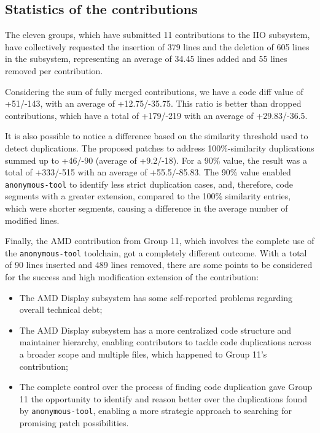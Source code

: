 \documentclass[10pt,conference]{IEEEtran}
\begin{document}
\subsection{Statistics of the contributions}

The eleven groups, which have submitted 11 contributions to the IIO subsystem, have collectively requested the insertion of 379 lines and the deletion of 605 lines in the subsystem, representing an average of 34.45 lines added and 55 lines removed per contribution.

Considering the sum of fully merged contributions, we have a code diff value of +51/-143, with an average of +12.75/-35.75. This ratio is better than dropped contributions, which have a total of +179/-219 with an average of +29.83/-36.5.

It is also possible to notice a difference based on the similarity threshold used to detect duplications. The proposed patches to address 100\%-similarity duplications summed up to +46/-90 (average of +9.2/-18). For a 90\% value, the result was a total of +333/-515 with an average of +55.5/-85.83. The 90\% value enabled \texttt{anonymous-tool} to identify less strict duplication cases, and, therefore, code segments with a greater extension, compared to the 100\% similarity entries, which were shorter segments, causing a difference in the average number of modified lines.

Finally, the AMD contribution from Group 11, which involves the complete use of the \texttt{anonymous-tool} toolchain, got a completely different outcome. With a total of 90 lines inserted and 489 lines removed, there are some points to be considered for the success and high modification extension of the contribution:

\begin{itemize}
    \item The AMD Display subsystem has some self-reported problems regarding overall technical debt;
    \item The AMD Display subsystem has a more centralized code structure and maintainer hierarchy, enabling contributors to tackle code duplications across a broader scope and multiple files, which happened to Group 11's contribution;
    \item The complete control over the process of finding code duplication gave Group 11 the opportunity to identify and reason better over the duplications found by \texttt{anonymous-tool}, enabling a more strategic approach to searching for promising patch possibilities. 
\end{itemize}
\end{document}
